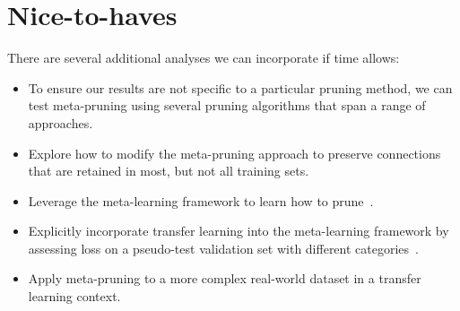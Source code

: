 \documentclass{article}
\begin{document}
\section{Nice-to-haves}

There are several additional analyses we can incorporate if time allows:

\begin{itemize}
	\item To ensure our results are not specific to a particular pruning method, we can test meta-pruning using several pruning algorithms that span a range of approaches.
	\item Explore how to modify the meta-pruning approach to preserve connections that are retained in most, but not all training sets.
	\item Leverage the meta-learning framework to learn how to prune~\citet{NIPS_learning_weights_pruning}.
	\item Explicitly incorporate transfer learning into the meta-learning framework by assessing loss on a pseudo-test validation set with different categories~\citet{metalearning2}.
	\item Apply meta-pruning to a more complex real-world dataset in a transfer learning context.
\end{itemize}
\end{document}
